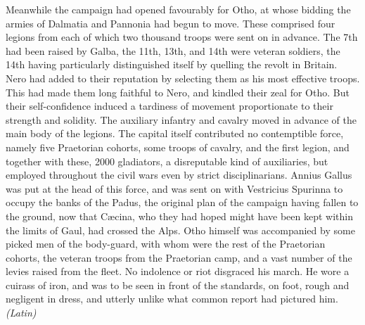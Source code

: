 Meanwhile the campaign had opened favourably for Otho, at whose bidding the armies of Dalmatia and Pannonia had begun to move. These comprised four legions from each of which two thousand troops were sent on in advance. The 7th had been raised by Galba, the 11th, 13th, and 14th were veteran soldiers, the 14th having particularly distinguished itself by quelling the revolt in Britain. Nero had added to their reputation by selecting them as his most effective troops. This had made them long faithful to Nero, and kindled their zeal for Otho. But their self-confidence induced a tardiness of movement proportionate to their strength and solidity. The auxiliary infantry and cavalry moved in advance of the main body of the legions. The capital itself contributed no contemptible force, namely five Praetorian cohorts, some troops of cavalry, and the first legion, and together with these, 2000 gladiators, a disreputable kind of auxiliaries, but employed throughout the civil wars even by strict disciplinarians. Annius Gallus was put at the head of this force, and was sent on with Vestricius Spurinna to occupy the banks of the Padus, the original plan of the campaign having fallen to the ground, now that Cæcina, who they had hoped might have been kept within the limits of Gaul, had crossed the Alps. Otho himself was accompanied by some picked men of the body-guard, with whom were the rest of the Praetorian cohorts, the veteran troops from the Praetorian camp, and a vast number of the levies raised from the fleet. No indolence or riot disgraced his march. He wore a cuirass of iron, and was to be seen in front of the standards, on foot, rough and negligent in dress, and utterly unlike what common report had pictured him. \emph{(Latin)}


